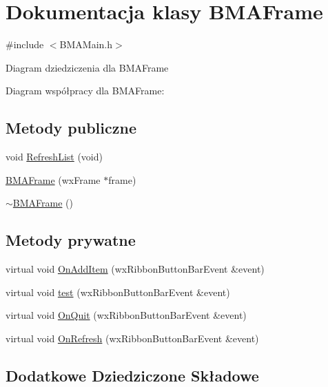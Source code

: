 \hypertarget{class_b_m_a_frame}{\section{Dokumentacja klasy B\+M\+A\+Frame}
\label{class_b_m_a_frame}
}


{\ttfamily \#include $<$B\+M\+A\+Main.\+h$>$}



Diagram dziedziczenia dla B\+M\+A\+Frame


Diagram współpracy dla B\+M\+A\+Frame\+:
\subsection*{Metody publiczne}
\begin{DoxyCompactItemize}
\item 
void \hyperlink{class_b_m_a_frame_af2c2da9a3c70647e70be099a2cbf4b50}{Refresh\+List} (void)
\item 
\hyperlink{class_b_m_a_frame_ac21189c22d2e7588e6d18f33636369ba}{B\+M\+A\+Frame} (wx\+Frame $\ast$frame)
\item 
\hyperlink{class_b_m_a_frame_a45f96400765e02bdbe59160fcd2f8fef}{$\sim$\+B\+M\+A\+Frame} ()
\end{DoxyCompactItemize}
\subsection*{Metody prywatne}
\begin{DoxyCompactItemize}
\item 
virtual void \hyperlink{class_b_m_a_frame_a3234b4f776104caca6749069617a9636}{On\+Add\+Item} (wx\+Ribbon\+Button\+Bar\+Event \&event)
\item 
virtual void \hyperlink{class_b_m_a_frame_a16d84140830e8b756452135bb2c8711b}{test} (wx\+Ribbon\+Button\+Bar\+Event \&event)
\item 
virtual void \hyperlink{class_b_m_a_frame_ad8399f7bf1c97356fd95f6ec1e470c31}{On\+Quit} (wx\+Ribbon\+Button\+Bar\+Event \&event)
\item 
virtual void \hyperlink{class_b_m_a_frame_aeadc0046b152d112f57466ad7bbb27f5}{On\+Refresh} (wx\+Ribbon\+Button\+Bar\+Event \&event)
\end{DoxyCompactItemize}
\subsection*{Dodatkowe Dziedziczone Składowe}


